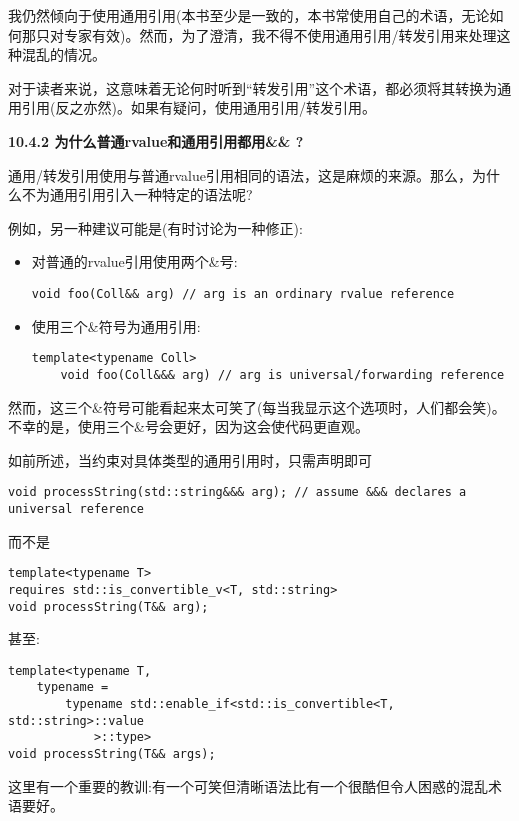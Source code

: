 我仍然倾向于使用通用引用(本书至少是一致的，本书常使用自己的术语，无论如何那只对专家有效)。然而，为了澄清，我不得不使用通用引用/转发引用来处理这种混乱的情况。\par

对于读者来说，这意味着无论何时听到“转发引用”这个术语，都必须将其转换为通用引用(反之亦然)。如果有疑问，使用通用引用/转发引用。\par

\hspace*{\fill} \par %
\textbf{10.4.2 为什么普通rvalue和通用引用都用\&\& ?}

通用/转发引用使用与普通rvalue引用相同的语法，这是麻烦的来源。那么，为什么不为通用引用引入一种特定的语法呢?\par

例如，另一种建议可能是(有时讨论为一种修正):\par

\begin{itemize}
	\item 对普通的rvalue引用使用两个\&号:
	\begin{lstlisting}[caption={}]
	void foo(Coll&& arg) // arg is an ordinary rvalue reference
	\end{lstlisting}
	\item 使用三个\&符号为通用引用:
	\begin{lstlisting}[caption={}]
	template<typename Coll>
	void foo(Coll&&& arg) // arg is universal/forwarding reference
	\end{lstlisting}
\end{itemize}

然而，这三个\&符号可能看起来太可笑了(每当我显示这个选项时，人们都会笑)。不幸的是，使用三个\&号会更好，因为这会使代码更直观。\par

如前所述，当约束对具体类型的通用引用时，只需声明即可\par

\begin{lstlisting}[caption={}]
void processString(std::string&&& arg); // assume &&& declares a universal reference
\end{lstlisting}

而不是\par

\begin{lstlisting}[caption={}]
template<typename T>
requires std::is_convertible_v<T, std::string>
void processString(T&& arg);
\end{lstlisting}

甚至:\par

\begin{lstlisting}[caption={}]
template<typename T,
	typename =
		typename std::enable_if<std::is_convertible<T, std::string>::value
			>::type>
void processString(T&& args);
\end{lstlisting}

这里有一个重要的教训:有一个可笑但清晰语法比有一个很酷但令人困惑的混乱术语要好。\par

















